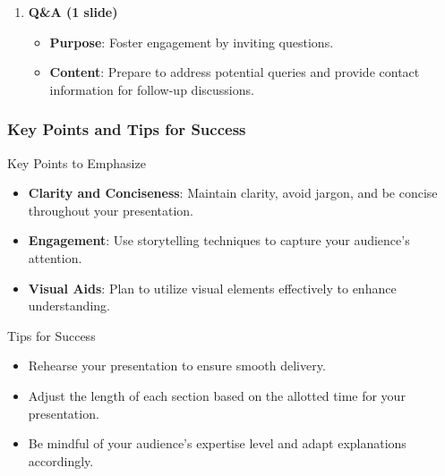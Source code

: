 \documentclass[aspectratio=169]{beamer}
\begin{document}
\begin{frame}[fragile]
\begin{enumerate}
\begin{itemize}
                    \begin{itemize}
                        \item Restate the significance of your research.
                        \item Offer recommendations for future research or practical applications.
                    \end{itemize}
                \item \textbf{Example}: ``This study highlights the urgency of addressing climate resiliency to support vulnerable populations in rural areas.''
            \end{itemize}
        \item \textbf{Q\&A (1 slide)}
            \begin{itemize}
                \item \textbf{Purpose}: Foster engagement by inviting questions.
                \item \textbf{Content}: Prepare to address potential queries and provide contact information for follow-up discussions.
            \end{itemize}
    \end{enumerate}
\end{frame}

\begin{frame}[fragile]
    \frametitle{Key Points and Tips for Success}
    \begin{block}{Key Points to Emphasize}
        \begin{itemize}
            \item \textbf{Clarity and Conciseness}: Maintain clarity, avoid jargon, and be concise throughout your presentation.
            \item \textbf{Engagement}: Use storytelling techniques to capture your audience's attention.
            \item \textbf{Visual Aids}: Plan to utilize visual elements effectively to enhance understanding.
        \end{itemize}
    \end{block}

    \begin{block}{Tips for Success}
        \begin{itemize}
            \item Rehearse your presentation to ensure smooth delivery.
            \item Adjust the length of each section based on the allotted time for your presentation.
            \item Be mindful of your audience's expertise level and adapt explanations accordingly.
        \end{itemize}
    \end{block}
\end{frame}
\end{document}
